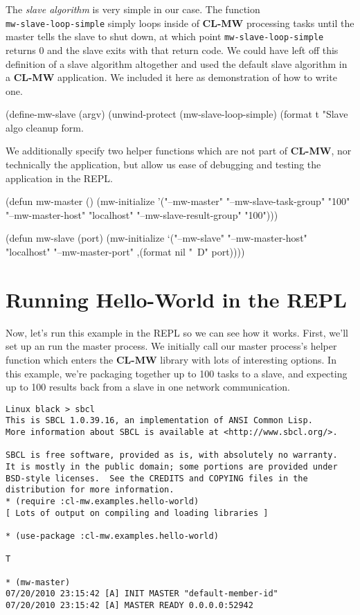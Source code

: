 \documentclass[titlepage,12pt]{book}
\newcommand{\xsmall}{\latexhtml{\small}{}}
\newcommand{\xnormalsize}{\latexhtml{\normalsize}{}}
\newcommand{\clmw}{\xsmall\textbf{CL-MW}\xnormalsize\xspace}
\newcommand{\sa}{\textit{slave algorithm}\xspace}
\newcommand{\func}[1]{\xsmall\mbox{\uppercase{\texttt{#1}}}\xnormalsize\xspace}
\newcommand{\file}[1]{\texttt{#1}\xspace}
\newcommand{\bold}[1]{\textbf{#1}\xspace}
\begin{document}
The \sa is very simple in our case. The function\\
\func{mw-slave-loop-simple} simply loops inside of \clmw processing
tasks until the master tells the slave to shut down, at which point
\func{mw-slave-loop-simple} returns 0 and the slave exits with
that return code. We could have left off this definition of a slave
algorithm altogether and used the default slave algorithm in a \clmw
application. We included it here as demonstration of how to write one.

\begin{lisp}[caption=\file{hello-world.lisp: \bold{Part 3 of 4}}]
(define-mw-slave (argv)
  (unwind-protect
       (mw-slave-loop-simple)
    (format t "Slave algo cleanup form.~%
\end{lisp}

We additionally specify two helper functions which are not part of
\clmw, nor technically the application, but allow us ease of debugging
and testing the application in the REPL.

\begin{lisp}[caption=\file{hello-world.lisp: \bold{Part 4 of 4}}]
(defun mw-master ()
  (mw-initialize 
    '("--mw-master" "--mw-slave-task-group" "100"
                    "--mw-master-host" "localhost"
                    "--mw-slave-result-group" "100")))

(defun mw-slave (port)
  (mw-initialize 
    `("--mw-slave" "--mw-master-host" "localhost"
                   "--mw-master-port"
                   ,(format nil "~D" port))))
\end{lisp}

\section{Running Hello-World in the REPL}

Now, let's run this example in the REPL so we can see how it
works. First, we'll set up an run the master process. We initially
call our master process's helper function which enters the \clmw
library with lots of interesting options. In this example, we're
packaging together up to 100 tasks to a slave, and expecting up to
100 results back from a slave in one network communication.

\small
\begin{verbatim}
Linux black > sbcl
This is SBCL 1.0.39.16, an implementation of ANSI Common Lisp.
More information about SBCL is available at <http://www.sbcl.org/>.

SBCL is free software, provided as is, with absolutely no warranty.
It is mostly in the public domain; some portions are provided under
BSD-style licenses.  See the CREDITS and COPYING files in the
distribution for more information.
* (require :cl-mw.examples.hello-world)
[ Lots of output on compiling and loading libraries ]

* (use-package :cl-mw.examples.hello-world)

T

* (mw-master)
07/20/2010 23:15:42 [A] INIT MASTER "default-member-id"
07/20/2010 23:15:42 [A] MASTER READY 0.0.0.0:52942
\end{verbatim}
\normalsize
\end{document}
